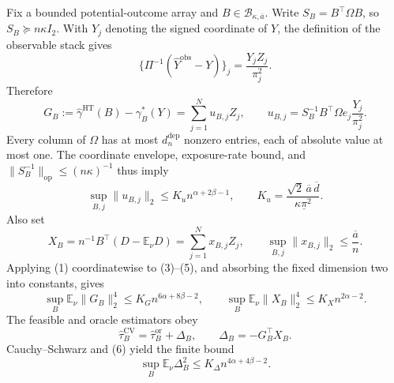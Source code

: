 Fix a bounded potential-outcome array and \(B\in\mathcal B_{\kappa,\overline a}\).  Write \(S_B=B^\top\Omega B\), so \(S_B\succeq n\kappa I_2\).  With \(Y_j\) denoting the signed coordinate of \(Y\), the definition of the observable stack gives
\[
 \{\Pi^{-1}(\widehat Y^{\mathrm{obs}}-Y)\}_j
 =\frac{Y_jZ_j}{\pi_j^2}.
\]
Therefore
\[
 G_B:=\widehat\gamma^{\mathrm{HT}}(B)-\gamma_B^*(Y)
 =\sum_{j=1}^{N}u_{B,j}Z_j,
 \qquad
 u_{B,j}=S_B^{-1}B^\top\Omega e_j\frac{Y_j}{\pi_j^2}.
 \tag{3}
\]
Every column of \(\Omega\) has at most \(d_n^{\mathrm{dep}}\) nonzero entries, each of absolute value at most one.  The coordinate envelope, exposure-rate bound, and \(\lVert S_B^{-1}\rVert_{\mathrm{op}}\leq(n\kappa)^{-1}\) thus imply
\[
 \sup_{B,j}\lVert u_{B,j}\rVert_2
 \leq K_u n^{\alpha+2\beta-1},
 \qquad
 K_u=\frac{\sqrt2\,\overline a\,\overline d}{\kappa\underline\pi^2}.
 \tag{4}
\]
Also set
\[
 X_B=n^{-1}B^\top(D-\mathbb E_\nu D)
 =\sum_{j=1}^{N}x_{B,j}Z_j,
 \qquad
 \sup_{B,j}\lVert x_{B,j}\rVert_2\leq\frac{\overline a}{n}.
 \tag{5}
\]
Applying (1) coordinatewise to (3)--(5), and absorbing the fixed dimension two into constants, gives
\[
 \sup_B\mathbb E_\nu\lVert G_B\rVert_2^4
 \leq K_G n^{6\alpha+8\beta-2},
 \qquad
 \sup_B\mathbb E_\nu\lVert X_B\rVert_2^4
 \leq K_X n^{2\alpha-2}.
 \tag{6}
\]
The feasible and oracle estimators obey
\[
 \widehat\tau_B^{\mathrm{CV}}
 =\widehat\tau_B^{\mathrm{or}}+\Delta_B,
 \qquad
 \Delta_B=-G_B^\top X_B.
 \tag{7}
\]
Cauchy--Schwarz and (6) yield the finite bound
\[
 \sup_B\mathbb E_\nu\Delta_B^2
 \leq K_\Delta n^{4\alpha+4\beta-2}.
 \tag{8}
\]

